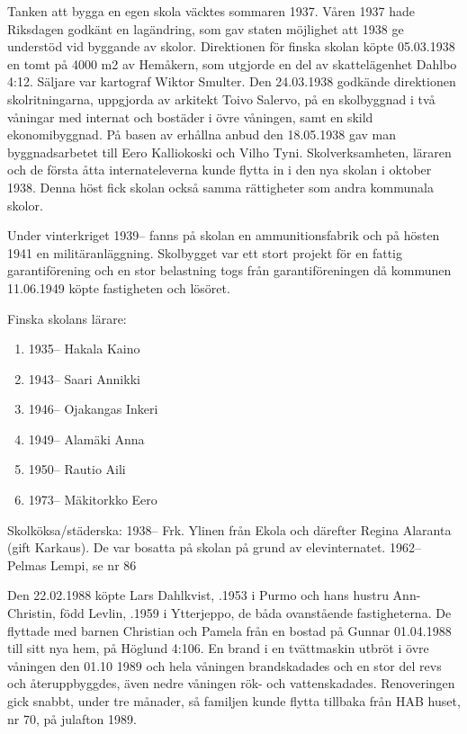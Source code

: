 Tanken att bygga en egen skola väcktes sommaren 1937. Våren 1937 hade Riksdagen godkänt en lagändring, som gav staten möjlighet att 1938 ge understöd vid byggande av skolor. Direktionen för finska skolan köpte	05.03.1938 en tomt på 4000 m2 av Hemåkern, som utgjorde en del av skattelägenhet Dahlbo 4:12. Säljare var kartograf Wiktor Smulter. Den	24.03.1938 godkände direktionen skolritningarna, uppgjorda av arkitekt Toivo Salervo, på en skolbyggnad i två våningar med internat och bostäder i övre våningen, samt en skild ekonomibyggnad. På basen av	erhållna anbud den 18.05.1938 gav man byggnadsarbetet till Eero Kalliokoski och Vilho Tyni. Skolverksamheten, läraren och de första åtta internateleverna kunde flytta in i den nya skolan i oktober 1938. Denna höst fick skolan också samma rättigheter som andra kommunala skolor.

Under vinterkriget 1939-- fanns på skolan en ammunitionsfabrik och	på hösten 1941 en militäranläggning. Skolbygget var ett stort projekt för en fattig garantiförening och en stor belastning togs från garantiföreningen då kommunen 11.06.1949 köpte	fastigheten och lösöret.

Finska skolans lärare:
\begin{enumerate}
  \item 1935-- Hakala Kaino
  \item 1943--	Saari Annikki
  \item 1946--	Ojakangas Inkeri
  \item 1949--	Alamäki Anna
  \item 1950--	Rautio Aili
  \item 1973--	Mäkitorkko Eero
\end{enumerate}

Skolköksa/städerska:
1938--	Frk. Ylinen från Ekola och därefter Regina Alaranta (gift Karkaus). De var bosatta på skolan på grund av 		elevinternatet.
1962--	Pelmas Lempi, se nr 86






Den 22.02.1988 köpte Lars Dahlkvist, .1953 i Purmo och	hans hustru Ann-Christin, född Levlin, .1959 i Ytterjeppo, de båda ovanstående fastigheterna. De flyttade med barnen Christian och Pamela från en bostad på Gunnar 01.04.1988 till sitt nya hem, på Höglund	4:106. En brand i en tvättmaskin utbröt i övre våningen den 01.10 1989 	och hela våningen brandskadades och en stor del revs och 	återuppbyggdes, även nedre våningen rök- och vattenskadades. 	Renoveringen gick snabbt, under tre månader, så familjen kunde flytta tillbaka från HAB huset, nr 70, på	julafton 1989.

